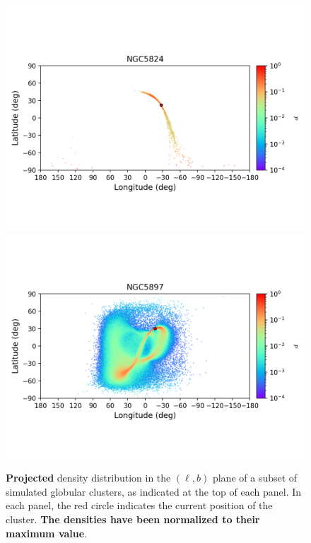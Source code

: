 \begin{figure}
        \includegraphics[clip=true, trim = 0mm 20mm 0mm 10mm, width=1\columnwidth]{images/error_plots_NGC5824.png}
        \includegraphics[clip=true, trim = 0mm 20mm 0mm 10mm, width=1\columnwidth]{images/error_plots_NGC5897.png}
        \caption[]{\textbf{Projected} density distribution in the $(\ell, b)$ plane of a subset of simulated globular clusters, as indicated at the top of each panel. In each panel, the red circle indicates the current position of the cluster. \textbf{The densities have been normalized to their maximum value}.}\label{stream6}
        \end{figure}

